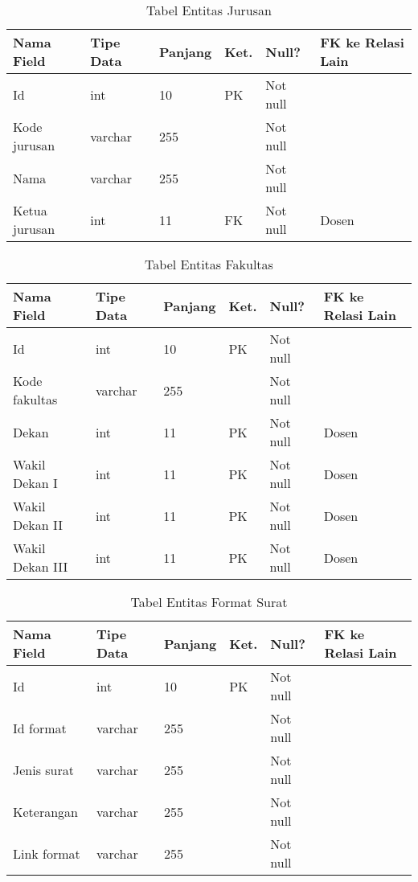 \begin{table}[H]
\centering
\caption{Tabel Entitas Jurusan}
\label{entitas_jurusan}
\begin{tabular}{|l|l|l|l|l|l|}
\hline
\textbf{Nama Field}&\textbf{Tipe Data}&\textbf{Panjang}&\textbf{Ket.}&\textbf{Null?}&\textbf{FK ke Relasi Lain}\\ \hline
Id&int&10&PK&Not null&\\ \hline
Kode jurusan&varchar&255&&Not null&\\ \hline
Nama&varchar&255&&Not null&\\ \hline
Ketua jurusan&int&11&FK&Not null&Dosen\\ \hline
\end{tabular}
\end{table}

\begin{table}[H]
\centering
\caption{Tabel Entitas Fakultas}
\label{entitas_fakultas}
\begin{tabular}{|l|l|l|l|l|l|}
\hline
\textbf{Nama Field}&\textbf{Tipe Data}&\textbf{Panjang}&\textbf{Ket.}&\textbf{Null?}&\textbf{FK ke Relasi Lain}\\ \hline
Id&int&10&PK&Not null&\\ \hline
Kode fakultas&varchar&255&&Not null&\\ \hline
Dekan&int&11&PK&Not null&Dosen\\ \hline
Wakil Dekan I&int&11&PK&Not null&Dosen\\ \hline
Wakil Dekan II&int&11&PK&Not null&Dosen\\ \hline
Wakil Dekan III&int&11&PK&Not null&Dosen\\ \hline\end{tabular}
\end{table}

\begin{table}[H]
\centering
\caption{Tabel Entitas Format Surat}
\label{entitas_format_surat}
\begin{tabular}{|l|l|l|l|l|l|}
\hline
\textbf{Nama Field}&\textbf{Tipe Data}&\textbf{Panjang}&\textbf{Ket.}&\textbf{Null?}&\textbf{FK ke Relasi Lain}\\ \hline
Id&int&10&PK&Not null&\\ \hline
Id format&varchar&255&&Not null&\\ \hline
Jenis surat&varchar&255&&Not null&\\ \hline
Keterangan&varchar&255&&Not null&\\ \hline
Link format&varchar&255&&Not null&\\ \hline
\end{tabular}
\end{table}

